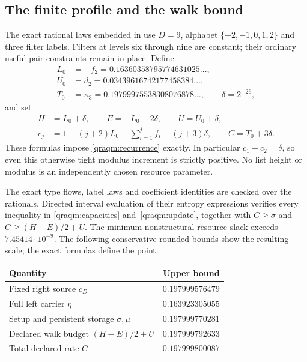 \documentclass[10pt,a4paper]{article}
\theoremstyle{definition}
\begin{document}
\subsection{The finite profile and the walk bound}

The exact rational laws embedded in  use $D=9$,
alphabet
$\{-2,-1,0,1,2\}$ and three filter labels. Filters at levels six through
nine are constant; their ordinary useful-pair constraints remain in place.
Define
\begin{align*}
 L_0&=-f_2=0.16360358795774631025\ldots,\\
 U_0&=d_2=0.03439616742177458384\ldots,\\
 T_0&=\kappa_3=0.19799975538308076878\ldots,
 \qquad \delta=2^{-26},
\end{align*}
and set
\begin{equation}
 \begin{split}
 H&=L_0+\delta,\qquad E=-L_0-2\delta,\qquad U=U_0+\delta,\\
 c_j&=1-(j+2)L_0-\sum_{i=1}^{j}f_i-(j+3)\delta,\qquad
 C=T_0+3\delta.
 \end{split}
 \label{qraqm:finite-rates}
\end{equation}
These formulas impose \eqref{qraqm:recurrence} exactly. In particular
$c_1-c_2=\delta$, so even this otherwise tight modulus increment is
strictly positive. No list height or modulus is an independently chosen
resource parameter.

The exact type flows, label laws and coefficient identities are checked
over the rationals. Directed interval evaluation of their entropy
expressions verifies every inequality in
\eqref{qraqm:capacities} and~\eqref{qraqm:update}, together with
$C\ge\sigma$ and $C\ge(H-E)/2+U$. The minimum nonstructural resource
slack exceeds $7.45414\cdot10^{-9}$. The following conservative rounded
bounds show the resulting scale; the exact formulas define the point.
\begin{center}\small
\begin{tabular}{@{}lr@{}}\toprule
Quantity & Upper bound\\\midrule
Fixed right source $c_D$ & $0.197999576479$\\
Full left carrier $\eta$ & $0.163923305055$\\
Setup and persistent storage $\sigma,\mu$ & $0.197999770281$\\
Declared walk budget $(H-E)/2+U$ & $0.197999792633$\\
Total declared rate $C$ & $0.197999800087$\\\bottomrule
\end{tabular}
\end{center}
\end{document}
